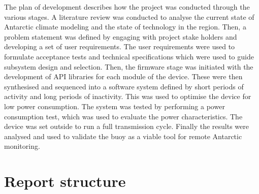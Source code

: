 The plan of development describes how the project was conducted through the various stages. A literature review was conducted to analyse the current state of Antarctic climate modeling and the state of technology in the region. Then, a problem statement was defined by engaging with project stake holders and developing a set of user requirements. The user requirements were used to formulate acceptance tests and technical specifications which were used to guide subsystem design and selection. Then, the firmware stage was initiated with the development of API libraries for each module of the device. These were then synthesised and sequenced into a software system defined by short periods of activity and long periods of inactivity. This was used to optimise the device for low power consumption. The system was tested by performing a power consumption test, which was used to evaluate the power characteristics. The device was set outside to run a full transmission cycle. Finally the results were analysed and used to validate the buoy as a viable tool for remote Antarctic monitoring.
\pagebreak
\section{Report structure}

